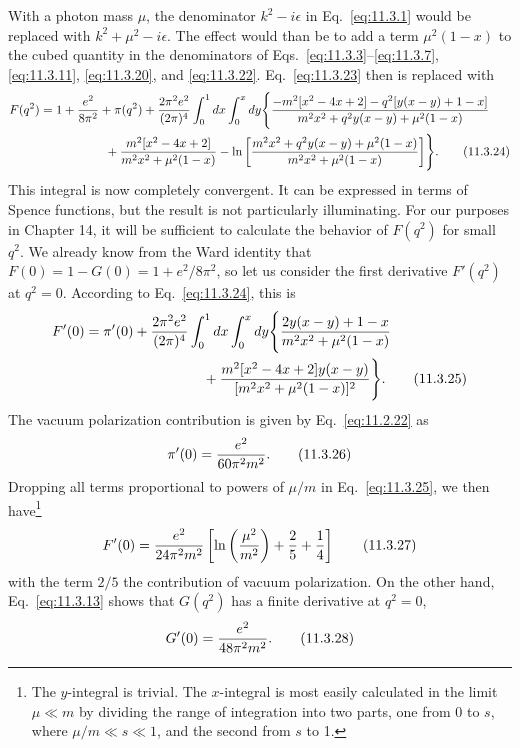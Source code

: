 With a photon mass $\mu$, the denominator $k^2-i\epsilon$ in Eq.~\eqref{eq:11.3.1}
would be replaced with $k^2+\mu^2-i\epsilon$. The effect would than be to add
a term $\mu^2(1-x)$ to the cubed quantity in the denominators of
Eqs.~\eqref{eq:11.3.3}--\eqref{eq:11.3.7}, \eqref{eq:11.3.11}, \eqref{eq:11.3.20}, and \eqref{eq:11.3.22}. Eq.~\eqref{eq:11.3.23}
then is replaced with
\begin{align}
F(q^2)={}&1+{e^2\over8\pi^2}+\pi(q^2)
 +{2\pi^2e^2\over(2\pi)^4}\int_0^1dx\int_0^xdy
 \Biggl\{{-m^2[x^2-4x+2]-q^2[y(x-y)+1-x]
 \over m^2x^2+q^2y(x-y)+\mu^2(1-x)}\notag\\
&\hspace{14mm}+{m^2[x^2-4x+2]\over m^2x^2+\mu^2(1-x)}
 -\ln\left[{m^2x^2+q^2y(x-y)+\mu^2(1-x)
 \over m^2x^2+\mu^2(1-x)}\right]\Biggr\}.
\tag{11.3.24}\label{eq:11.3.24}
\end{align}
This integral is now completely convergent. It can be expressed in terms of
Spence functions, but the result is not particularly illuminating. For our
purposes in Chapter 14, it will be sufficient to calculate the behavior of
$F(q^2)$ for small $q^2$. We already know from the Ward identity that
$F(0)=1-G(0)=1+e^2/8\pi^2$, so let us consider the first derivative $F'(q^2)$
at $q^2=0$. According to Eq.~\eqref{eq:11.3.24}, this is
\begin{align}
F'(0)={}&\pi'(0)+{2\pi^2e^2\over(2\pi)^4}
 \int_0^1dx\int_0^xdy
 \Biggl\{{2y(x-y)+1-x\over m^2x^2+\mu^2(1-x)}\notag\\
&\hspace{25mm}+{m^2[x^2-4x+2]y(x-y)
 \over[m^2x^2+\mu^2(1-x)]^2}\Biggr\}.
\tag{11.3.25}\label{eq:11.3.25}
\end{align}
The vacuum polarization contribution is given by Eq.~\eqref{eq:11.2.22} as
\begin{equation}
\pi'(0)={e^2\over60\pi^2m^2}.
\tag{11.3.26}\label{eq:11.3.26}
\end{equation}
Dropping all terms proportional to powers of $\mu/m$ in Eq.~\eqref{eq:11.3.25}, we
then have\footnote{The $y$-integral is trivial. The $x$-integral is most
easily calculated in the limit $\mu\ll m$ by dividing the range of integration
into two parts, one from 0 to $s$, where $\mu/m\ll s\ll1$, and the second from
$s$ to 1.}
\begin{equation}
F'(0)={e^2\over24\pi^2m^2}
 \left[\ln\left({\mu^2\over m^2}\right)+{2\over5}+{1\over4}\right]
\tag{11.3.27}\label{eq:11.3.27}
\end{equation}
with the term $2/5$ the contribution of vacuum polarization. On the other
hand, Eq.~\eqref{eq:11.3.13} shows that $G(q^2)$ has a finite derivative at $q^2=0$,
\begin{equation}
G'(0)={e^2\over48\pi^2m^2}.
\tag{11.3.28}\label{eq:11.3.28}
\end{equation}

